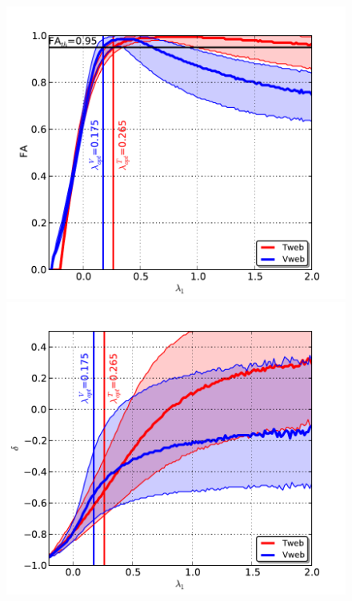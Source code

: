 \documentclass[a4,useAMS,usenatbib,usegraphicx]{latex/mn2e}
\begin{document}


\begin{flushleft}
\begin{figure}
\centering

  \includegraphics[trim = 2mm 2mm 5mm 10mm, clip, keepaspectratio=true,
  width=0.3\textheight]{./figures/FA_L1.pdf}
  \includegraphics[trim = 2mm 2mm 5mm 10mm, clip, keepaspectratio=true,
  width=0.3\textheight]{./figures/delta_L1.pdf}  
  

\end{figure}
\end{flushleft}
\end{document}

